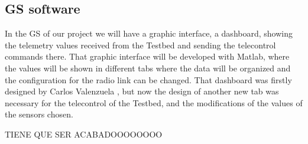 \subsection{\acrshort{GS} software} \label{ssec:ground} 
In the \acrshort{GS} of our project we will have a graphic interface, a dashboard, showing the telemetry values received from the Testbed and sending the telecontrol commands there. That graphic interface will be developed with Matlab, where the values will be shown in different tabs where the data will be organized and the configuration for the radio link can be changed. That dashboard was firstly designed by Carlos Valenzuela \cite{carlos}, but now the design of another new tab was necessary for the telecontrol of the Testbed, and the modifications of the values of the sensors chosen. 


TIENE QUE SER ACABADOOOOOOOO


